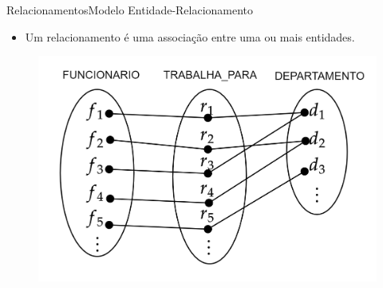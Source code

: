 \documentclass[t]{beamer}
\begin{document}
\begin{ftst}{Relacionamentos}{Modelo Entidade-Relacionamento}

\begin{itemize}
    \item Um relacionamento é uma associação entre uma ou mais entidades.
\end{itemize}

\begin{figure}
    \centering
    \includegraphics[scale=0.2]{Figuras/01_8.png}
\end{figure}

\end{ftst}

\end{document}
